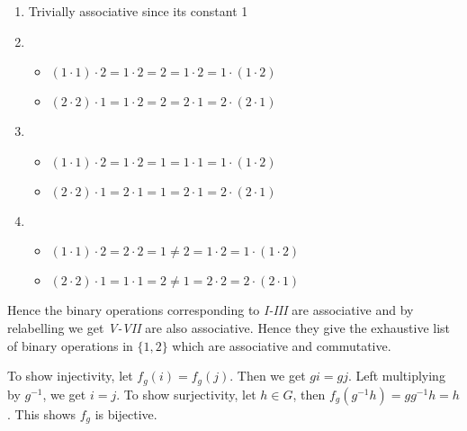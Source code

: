 \documentclass[12pt]{exam}
\theoremstyle{plain} %
\theoremstyle{definition} %
\theoremstyle{remark} %
\begin{document}
\begin{questions}
\begin{solution}
  \begin{enumerate}[label=\Roman*]
    \item Trivially associative since its constant 1
    \item \begin{itemize}[]
      \item $(1 \cdot 1) \cdot 2 = 1 \cdot 2 = 2 = 1 \cdot 2 = 1 \cdot (1 \cdot 2)$
      \item $(2 \cdot 2) \cdot 1 = 1 \cdot 2 = 2 = 2 \cdot 1 = 2 \cdot (2 \cdot 1)$
    \end{itemize}
    \item \begin{itemize}[]
      \item $(1 \cdot 1) \cdot 2 = 1 \cdot 2 = 1 = 1 \cdot 1 = 1 \cdot (1 \cdot 2)$
      \item $(2 \cdot 2) \cdot 1 = 2 \cdot 1 = 1 = 2 \cdot 1 = 2 \cdot (2 \cdot 1)$
    \end{itemize}
    \item \begin{itemize}[]
      \item $(1 \cdot 1) \cdot 2 = 2 \cdot 2 = 1 \neq 2 = 1 \cdot 2 = 1 \cdot (1 \cdot 2)$
      \item $(2 \cdot 2) \cdot 1 = 1 \cdot 1 = 2 \neq 1 = 2 \cdot 2 = 2 \cdot (2 \cdot 1)$
    \end{itemize}
  \end{enumerate}

  Hence the binary operations corresponding to \textit{I-III} are associative and by relabelling we get \textit{V-VII} are also associative. Hence they give the exhaustive list of binary operations in $\{ 1, 2 \}$ which are associative and commutative.

\end{solution}

\question
\begin{solution}
  To show injectivity, let $f_g(i) = f_g(j)$. Then we get $gi = gj$. Left multiplying by $g^{-1}$, we get $i = j$. To show surjectivity, let $h \in G$, then $f_g(g^{-1}h) = gg^{-1}h = h$. This shows $f_g$ is bijective.
\end{solution}

\question
\begin{solution}
\end{solution}
\end{questions}
\end{document}
